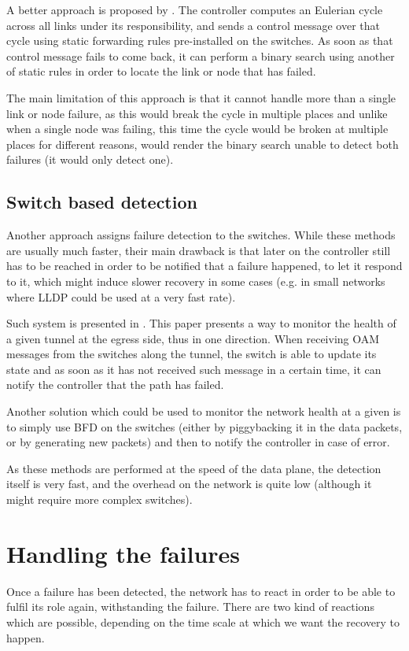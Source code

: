 \documentclass[compsoc]{IEEEtran}
\begin{document}
A better approach is proposed by \cite{2013arXiv1308.4465K}. The controller computes an Eulerian cycle across all links under its responsibility, and sends a control message over that cycle using static forwarding rules pre-installed on the switches. As soon as that control message fails to come back, it can perform a binary search using another of static rules in order to locate the link or node that has failed.

The main limitation of this approach is that it cannot handle more than a single link or node failure, as this would break the cycle in multiple places and unlike when a single node was failing, this time the cycle would be broken at multiple places for different reasons, would render the binary search unable to detect both failures (it would only detect one).

\subsection{Switch based detection}
Another approach assigns failure detection to the switches. While these methods are usually much faster, their main drawback is that later on the controller still has to be reached in order to be notified that a failure happened, to let it respond to it, which might induce slower recovery in some cases (e.g. in small networks where LLDP could be used at a very fast rate).

Such system is presented in \cite{6364688}. This paper presents a way to monitor the health of a given tunnel at the egress side, thus in one direction. When receiving OAM messages from the switches along the tunnel, the switch is able to update its state and as soon as it has not received such message in a certain time, it can notify the controller that the path has failed.

Another solution which could be used to monitor the network health at a given is to simply use BFD on the switches (either by piggybacking it in the data packets, or by generating new packets) and then to notify the controller in case of error.

As these methods are performed at the speed of the data plane, the detection itself is very fast, and the overhead on the network is quite low (although it might require more complex switches).

\section{Handling the failures}
Once a failure has been detected, the network has to react in order to be able to fulfil its role again, withstanding the failure. There are two kind of reactions which are possible, depending on the time scale at which we want the recovery to happen.
\end{document}
